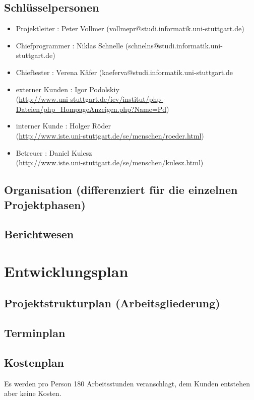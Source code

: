 \documentclass[a4paper,10pt]{scrartcl}
\begin{document}
\subsection{Schlüsselpersonen}
\begin{itemize}
\item
Projektleiter : Peter Vollmer (vollmepr@studi.informatik.uni-stuttgart.de)
\item
Chiefprogrammer : Niklas Schnelle (schnelns@studi.informatik.uni-stuttgart.de)
\item
Chieftester : Verena Käfer (kaeferva@studi.informatik.uni-stuttgart.de
\item
externer Kunden : Igor Podolskiy\\
(\href{http://www.uni-stuttgart.de/iev/institut/php-Dateien/php_HompageAnzeigen.php?Name=Pd}{http://www.uni-stuttgart.de/iev/institut/php-Dateien/php\_HompageAnzeigen.php?Name=Pd})
\item
interner Kunde : Holger Röder\\
(\href{http://www.iste.uni-stuttgart.de/se/menschen/roeder.html}{http://www.iste.uni-stuttgart.de/se/menschen/roeder.html})
\item 
Betreuer : Daniel Kulesz\\
(\href{http://www.iste.uni-stuttgart.de/se/menschen/kulesz.html}{http://www.iste.uni-stuttgart.de/se/menschen/kulesz.html})
\end{itemize}
\subsection{Organisation (differenziert für die einzelnen Projektphasen)}
\subsection{Berichtwesen}

\section{Entwicklungsplan}
\subsection{Projektstrukturplan (Arbeitsgliederung)}
\subsection{Terminplan}
\subsection{Kostenplan}
Es werden pro Person 180 Arbeitsstunden veranschlagt, dem Kunden entstehen aber keine Kosten.
\end{document}
